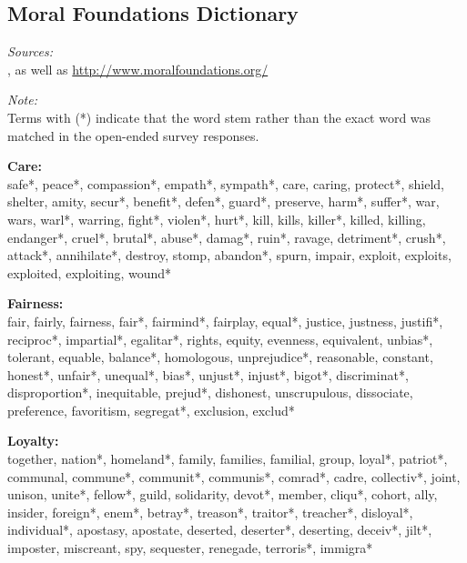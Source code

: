 \begin{flushleft} %
\section{Moral Foundations Dictionary}\label{app:dict}
\textit{Sources:}\\
\citet{graham2009liberals}, as well as \url{http://www.moralfoundations.org/}
\vspace{.5cm}

\textit{Note:}\\
Terms with (*) indicate that the word stem rather than the exact word was matched in the open-ended survey responses.
\vspace{.5cm}

\textbf{Care:}\\
safe*, peace*, compassion*, empath*, sympath*, care, caring, protect*, shield, shelter, amity, secur*, benefit*, defen*, guard*, preserve, harm*, suffer*, war, wars, warl*, warring, fight*, violen*, hurt*, kill, kills, killer*, killed, killing, endanger*, cruel*, brutal*, abuse*, damag*, ruin*, ravage, detriment*, crush*, attack*, annihilate*, destroy, stomp, abandon*, spurn, impair, exploit, exploits, exploited, exploiting, wound*
\vspace{.5cm}

\textbf{Fairness:}\\
fair, fairly, fairness, fair*, fairmind*, fairplay, equal*, justice, justness, justifi*, reciproc*, impartial*, egalitar*, rights, equity, evenness, equivalent, unbias*, tolerant, equable, balance*, homologous, unprejudice*, reasonable, constant, honest*, unfair*, unequal*, bias*, unjust*, injust*, bigot*, discriminat*, disproportion*, inequitable, prejud*, dishonest, unscrupulous, dissociate, preference, favoritism, segregat*, exclusion, exclud*
\vspace{.5cm}

\textbf{Loyalty:}\\
together, nation*, homeland*, family, families, familial, group, loyal*, patriot*, communal, commune*, communit*, communis*, comrad*, cadre, collectiv*, joint, unison, unite*, fellow*, guild, solidarity, devot*, member, cliqu*, cohort, ally, insider, foreign*, enem*, betray*, treason*, traitor*, treacher*, disloyal*, individual*, apostasy, apostate, deserted, deserter*, deserting, deceiv*, jilt*, imposter, miscreant, spy, sequester, renegade, terroris*, immigra*
\vspace{.5cm}


\end{flushleft}
